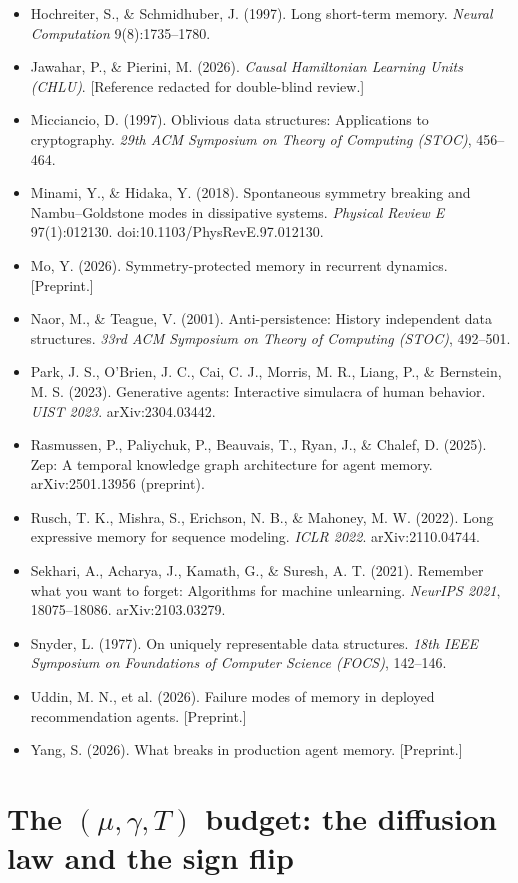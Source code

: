 {\begin{itemize}
\item Hochreiter, S., \& Schmidhuber, J. (1997). Long short-term memory. \emph{Neural Computation} 9(8):1735--1780.
\item Jawahar, P., \& Pierini, M. (2026). \emph{Causal Hamiltonian Learning Units (CHLU)}. [Reference redacted for double-blind review.]
\item Micciancio, D. (1997). Oblivious data structures: Applications to cryptography. \emph{29th ACM Symposium on Theory of Computing (STOC)}, 456--464.
\item Minami, Y., \& Hidaka, Y. (2018). Spontaneous symmetry breaking and Nambu--Goldstone modes in dissipative systems. \emph{Physical Review E} 97(1):012130. doi:10.1103/PhysRevE.97.012130.
\item Mo, Y. (2026). Symmetry-protected memory in recurrent dynamics. [Preprint.]
\item Naor, M., \& Teague, V. (2001). Anti-persistence: History independent data structures. \emph{33rd ACM Symposium on Theory of Computing (STOC)}, 492--501.
\item Park, J. S., O'Brien, J. C., Cai, C. J., Morris, M. R., Liang, P., \& Bernstein, M. S. (2023). Generative agents: Interactive simulacra of human behavior. \emph{UIST 2023}. arXiv:2304.03442.
\item Rasmussen, P., Paliychuk, P., Beauvais, T., Ryan, J., \& Chalef, D. (2025). Zep: A temporal knowledge graph architecture for agent memory. arXiv:2501.13956 (preprint).
\item Rusch, T. K., Mishra, S., Erichson, N. B., \& Mahoney, M. W. (2022). Long expressive memory for sequence modeling. \emph{ICLR 2022}. arXiv:2110.04744.
\item Sekhari, A., Acharya, J., Kamath, G., \& Suresh, A. T. (2021). Remember what you want to forget: Algorithms for machine unlearning. \emph{NeurIPS 2021}, 18075--18086. arXiv:2103.03279.
\item Snyder, L. (1977). On uniquely representable data structures. \emph{18th IEEE Symposium on Foundations of Computer Science (FOCS)}, 142--146.
\item Uddin, M. N., et al. (2026). Failure modes of memory in deployed recommendation agents. [Preprint.]
\item Yang, S. (2026). What breaks in production agent memory. [Preprint.]
\end{itemize}\par}

\section{The $(\mu,\gamma,T)$ budget: the diffusion law and the sign flip}\label{app:budget}

